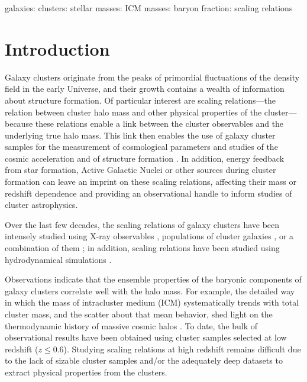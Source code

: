 \documentclass[useAMS,usenatbib,iop,numberedappendix]{mn2e}
\newcommand{\redshift}{\ensuremath{z}}
\begin{document}
%
%

\begin{keywords}
galaxies: clusters: stellar masses: ICM masses: baryon fraction: scaling relations
\end{keywords}

\clearpage

%
%

\section{Introduction}
\label{sec:introduction}


Galaxy clusters originate from the peaks of primordial fluctuations of the density field in the early Universe, and their growth contains a wealth of information about structure formation.  Of particular interest are scaling relations---the relation between cluster halo mass and other physical properties of the cluster---because these relations enable a link between the cluster observables and the underlying true halo mass.  This link then enables the use of galaxy cluster samples for the measurement of cosmological parameters and studies of the cosmic acceleration and of structure formation \citep{haiman01,holder01b,carlstrom02}.
In addition, energy feedback from star formation, Active Galactic Nuclei or other sources during cluster formation can leave an imprint on these scaling relations, affecting their mass or redshift dependence and providing an observational handle to inform studies of cluster astrophysics.


Over the last few decades, the scaling relations of galaxy clusters have been intensely studied using X-ray observables
\citep{mohr97,mohr99,arnaud99,reiprich02,ohara06,arnaud07,sun09,vikhlinin09a,pratt09,mantz16b}, populations of cluster galaxies \citep{lin03b,lin04a,rozo09,saro13,mulroy14}, or a combination of them \citep{zhang10,lin12,rozo14c}; in addition, scaling relations have been studied using hydrodynamical simulations \citep[e.g.,][]{evrard97,bryan98,nagai07,stanek10,truong16,barnes17,pillepich17}.  


Observations indicate that the ensemble properties of the baryonic components of galaxy clusters correlate well with the halo mass.
For example, the detailed way in which the mass of intracluster medium (ICM) systematically trends with total cluster mass, and the scatter about that mean behavior, shed light on the thermodynamic history of massive cosmic halos \citep[e.g.,][]{ponman99,mohr99,pratt10,young11}.
To date, the bulk of observational results have been obtained using cluster samples selected at low redshift ($\redshift\le0.6$).  Studying scaling relations at high redshift remains difficult due to the lack of sizable cluster samples and/or the adequately deep datasets to extract physical properties from the clusters. 
\end{document}

